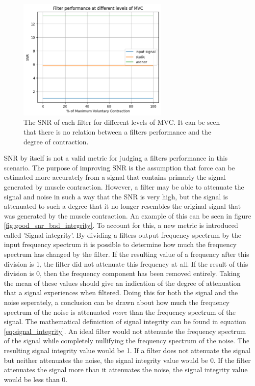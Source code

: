 \begin{figure}[h!t]
	\begin{center}
		\includegraphics[height=60mm]{images/filter_snr_mvc.png}
	\end{center}
	\caption{The SNR of each filter for different levels of MVC. It can be seen that there is no relation between a filters performance and the degree of contraction.}
	\label{fig:filter_snr_mvc}
\end{figure}

SNR by itself is not a valid metric for judging a filters performance in this scenario. The purpose of improving SNR is the assumption that force can be estimated more accurately from a signal that contains primarly the signal generated by muscle contraction. However, a filter may be able to attenuate the signal and noise in such a way that the SNR is very high, but the signal is attenuated to such a degree that it no longer resembles the original signal that was generated by the muscle contraction. An example of this can be seen in figure \ref{fig:good_snr_bad_integrity}. To account for this, a new metric is introduced called 'Signal integrity'. By dividing a filters output frequency spectrum by the input frequency spectrum it is possible to determine how much the frequency spectrum has changed by the filter. If the resulting value of a frequency after this division is 1, the filter did not attenuate this frequency at all. If the result of this division is 0, then the frequency component has been removed entirely. Taking the mean of these values should give an indication of the degree of attenuation that a signal experiences when filtered. Doing this for both the signal and the noise seperately, a conclusion can be drawn about how much the frequency spectrum of the noise is attenuated \textit{more} than the frequency spectrum of the signal. The mathematical definiction of signal integrity can be found in equation \ref{eq:signal_integrity}. An ideal filter would not attenuate the frequency spectrum of the signal while completely nullifying the frequency spectrum of the noise. The resulting signal integrity value would be 1. If a filter does not attenuate the signal but neither attenuates the noise, the signal integrity value would be 0. If the filter attenuates the signal more than it attenuates the noise, the signal integrity value would be less than 0.

